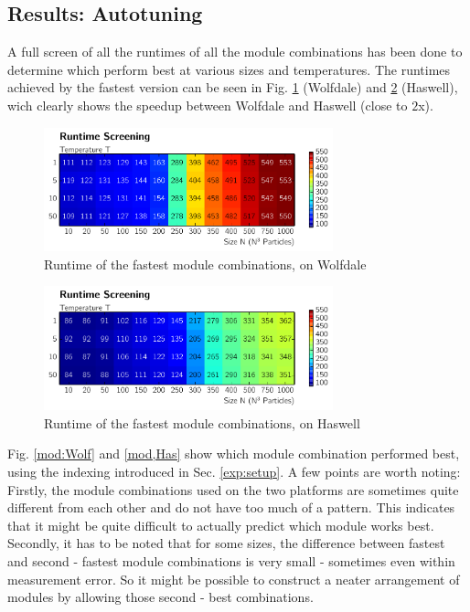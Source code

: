 \documentclass[letterpaper]{article}
\begin{document}
\subsection{Results: Autotuning}
A full screen of all the runtimes of all the module combinations has been done to determine which perform best at various sizes and temperatures. The runtimes achieved by the fastest version can be seen in Fig. \ref{screen:Wolf} (Wolfdale) and \ref{screen:Has} (Haswell), wich clearly shows the speedup between Wolfdale and Haswell (close to $2$x).
	\begin{figure}[h]\centering
	  \includegraphics[width = 8.36cm]{plots/matrix_msk.pdf}
	  \caption{Runtime of the fastest module combinations, on Wolfdale}
	  \label{screen:Wolf}
	\end{figure}
	\begin{figure}[h]\centering
	  \includegraphics[width = 8.36cm]{plots/matrix_dg.pdf}
	  \caption{Runtime of the fastest module combinations, on Haswell}
	  \label{screen:Has}
	\end{figure}\newline
Fig. \ref{mod:Wolf} and \ref{mod,Has} show which module combination performed best, using the indexing introduced in Sec. \ref{exp:setup}. A few points are worth noting: \newline
Firstly, the module combinations used on the two platforms are sometimes quite different from each other and do not have too much of a pattern. This indicates that it might be quite difficult to actually predict which module works best. \newline
Secondly, it has to be noted that for some sizes, the difference between fastest and second - fastest module combinations is very small - sometimes even within measurement error. So it might be possible to construct a neater arrangement of modules by allowing those second - best combinations.\newline
\end{document}
